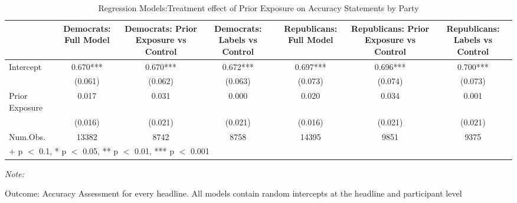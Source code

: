 \begin{table}

\caption{Regression Models:Treatment effect of Prior Exposure on Accuracy Statements by Party}
\centering
\begin{threeparttable}
\begin{tabular}[t]{lcccccc}
\toprule
  & Democrats: Full Model & Democrats: Prior Exposure vs Control & Democrats: Labels vs Control & Republicans: Full Model & Republicans: Prior Exposure vs Control & Republicans: Labels vs Control\\
\midrule
Intercept & 0.670*** & 0.670*** & 0.672*** & 0.697*** & 0.696*** & 0.700***\\
 & (0.061) & (0.062) & (0.063) & (0.073) & (0.074) & (0.073)\\
Prior Exposure & 0.017 & 0.031 & 0.000 & 0.020 & 0.034 & 0.001\\
 & (0.016) & (0.021) & (0.021) & (0.016) & (0.021) & (0.021)\\
\midrule
Num.Obs. & 13382 & 8742 & 8758 & 14395 & 9851 & 9375\\
\bottomrule
\multicolumn{7}{l}{\rule{0pt}{1em}+ p $<$ 0.1, * p $<$ 0.05, ** p $<$ 0.01, *** p $<$ 0.001}\\
\end{tabular}
\begin{tablenotes}
\item \textit{Note: } 
\item Outcome: Accuracy Assessment for every headline. All models contain random intercepts at the headline and participant level
\end{tablenotes}
\end{threeparttable}
\end{table}
